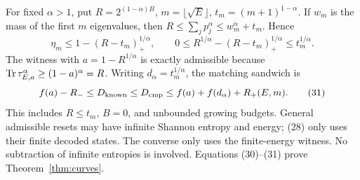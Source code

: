 For fixed \(\alpha>1\), put \(R=2^{(1-\alpha)B}\),
\(m=\lfloor\sqrt E\rfloor\), \(t_m=(m+1)^{1-\alpha}\).
If \(w_m\) is the mass of the first \(m\) eigenvalues, then
\(R\le\sum_jp_j^\alpha\le w_m^\alpha+t_m\).
Hence
\[
 \eta_m\le1-(R-t_m)_+^{1/\alpha},\qquad
 0\le R^{1/\alpha}-(R-t_m)_+^{1/\alpha}\le t_m^{1/\alpha}.
\]
The witness with \(a=1-R^{1/\alpha}\) is exactly admissible because
\(\operatorname{Tr}\tau_{E,a}^\alpha\ge(1-a)^\alpha=R\).
Writing \(d_\alpha=t_m^{1/\alpha}\), the matching sandwich is
\[
 f(a)-R_-\le D_{\rm known}\le D_{\mathrm{cmp}}
       \le f(a)+f(d_\alpha)+R_+(E,m).                         \tag{31}
\]
This includes \(R\le t_m\), \(B=0\), and unbounded growing budgets.
General admissible resets may have infinite Shannon entropy and energy;
(28) only uses their finite decoded states. The converse only uses the
finite-energy witness. No subtraction of infinite entropies is involved.
Equations (30)--(31) prove Theorem~\ref{thm:curves}.

